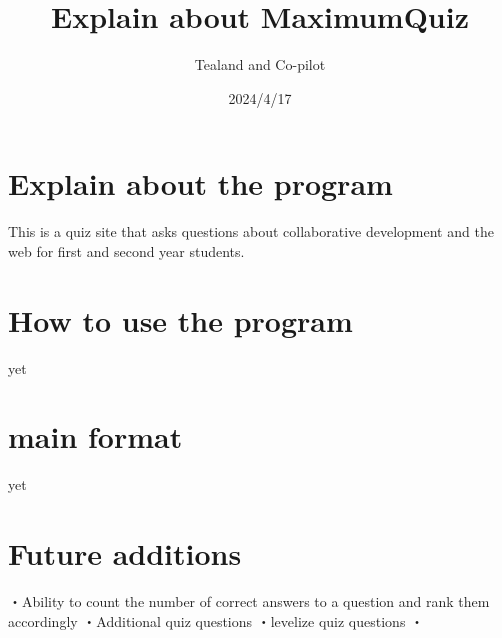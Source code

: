 \documentclass{article}ドキュメントのクラスを指定するコマンド
\title{Explain about MaximumQuiz}  ここでは日本語は表示されなくなる
\author{Tealand and Co-pilot}
\date{2024/4/17}
\begin{document}
\maketitle

\section{Explain about the program}

This is a quiz site that asks questions about collaborative development and the web for first and second year students.

\section{How to use the program}

yet

\section{main format}

yet

\section{Future additions}
・Ability to count the number of correct answers to a question and rank them accordingly
・Additional quiz questions
・levelize quiz questions
・
\end{document}
